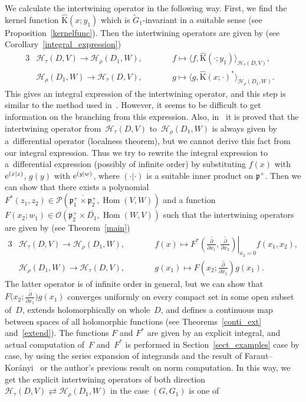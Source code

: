 \documentclass[pdftex]{sigma}
\numberwithin{equation}{section}
\newcommand{\fp}{\mathfrak{p}}
\newcommand{\cH}{\mathcal{H}}
\newcommand{\cO}{\mathcal{O}}
\newcommand{\cP}{\mathcal{P}}
\newcommand{\rK}{\mathrm{K}}
\newcommand{\Hom}{\operatorname{Hom}}
\begin{document}
We calculate the intertwining operator in the following way. First, we find the kernel function $\hat{\rK}(x;y_1)$ which is $\tilde{G}_1$-invariant in a suitable sense (see Proposition~\ref{kernelfunc}). Then the intertwining operators are given by (see Corollary~\ref{integral_expression})
\begin{alignat*}{3}
& \cH_{\tau}(D,V) \to \cH_{\rho}(D_1,W),\qquad && f \mapsto \big\langle f,\hat{\rK}(\cdot;y_1)\big\rangle_{\cH_\tau(D,V)},&\\
& \cH_{\rho}(D_1,W) \to \cH_{\tau}(D,V),\qquad && g \mapsto \big\langle g,\hat{\rK}(x;\cdot)^*\big\rangle_{\cH_\rho(D_1,W)}. &
\end{alignat*}
This gives an integral expression of the intertwining operator, and this step is similar to the method used in~\cite{KS0, KS1, KS2, MOO}. However, it seems to be difficult to get information on the bran\-ching from this expression. Also, in~\cite{KP1} it is proved that the intertwining operator from~$\cH_{\tau}(D,V)$ to~$\cH_{\rho}(D_1,W)$ is always given by a~differential operator (localness theorem), but we cannot derive this fact from our integral expression. Thus we try to rewrite the integral expression to a~differential expression (possibly of infinite order) by substituting $f(x)$ with~${\rm e}^{(x|z)}$, $g(y)$ with ${\rm e}^{(y|w)}$, where $(\cdot|\cdot)$ is a suitable inner product on $\fp^+$. Then we can show that there exists a polynomial $F^*(z_1,z_2)\in\cP(\overline{\fp^+_1\times\fp^+_2},\Hom(V,W))$ and a function $F(x_2;w_1)\in\cO(\fp^+_2\times\overline{D_1},\Hom(W,V))$ such that the intertwining operators are given by (see Theorem~\ref{main})
\begin{alignat*}{3}
&\cH_\tau(D,V)\to\cH_\rho(D_1,W),\qquad && f(x) \mapsto F^*\left.\left(\overline{\frac{\partial}{\partial x_1}},\overline{\frac{\partial}{\partial x_2}}\right)\right|_{x_2=0}f(x_1,x_2), & \\
& \cH_\rho(D_1,W) \to\cH_\tau(D,V),\qquad && g(x_1) \mapsto F\left(x_2;\overline{\frac{\partial}{\partial x_1}}\right)g(x_1).&
\end{alignat*}
The latter operator is of infinite order in general, but we can show that $F\big(x_2;\overline{\frac{\partial}{\partial x_1}}\big)g(x_1)$ converges uniformly on every compact set in some open subset of~$D$, extends holomorphically on whole~$D$, and defines a continuous map between spaces of all holomorphic functions (see Theo\-rems~\ref{conti_ext} and~\ref{extend}). The functions $F$ and $F^*$ are given by an explicit integral, and actual computation of~$F$ and~$F^*$ is performed in Section~\ref{sect_examples} case by case, by using the series expansion of integrands and the result of Faraut--Kor\'anyi~\cite{FK0} or the author's previous result \cite{N2} on norm computation. In this way, we get the explicit intertwining operators of both direction $\cH_\tau(D,V)\rightleftarrows\cH_\rho(D_1,W)$ in the case $(G,G_1)$ is one of
\end{document}
